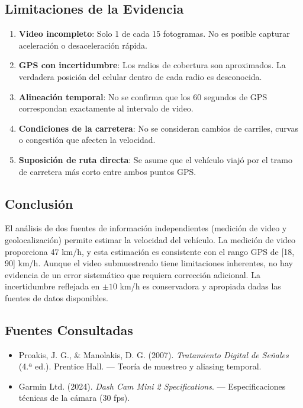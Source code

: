 \documentclass[12pt]{article}
\begin{document}
\subsection*{Limitaciones de la Evidencia}

\begin{enumerate}
    \item \textbf{Video incompleto}: Solo 1 de cada 15 fotogramas. No es posible capturar aceleración o desaceleración rápida.
    
    \item \textbf{GPS con incertidumbre}: Los radios de cobertura son aproximados. La verdadera posición del celular dentro de cada radio es desconocida.
    
    \item \textbf{Alineación temporal}: No se confirma que los 60 segundos de GPS correspondan exactamente al intervalo de video.
    
    \item \textbf{Condiciones de la carretera}: No se consideran cambios de carriles, curvas o congestión que afecten la velocidad.
    
    \item \textbf{Suposición de ruta directa}: Se asume que el vehículo viajó por el tramo de carretera más corto entre ambos puntos GPS.
\end{enumerate}

\subsection*{Conclusión}

El análisis de dos fuentes de información independientes (medición de video y geolocalización) permite estimar la velocidad del vehículo. La medición de video proporciona 47 km/h, y esta estimación es consistente con el rango GPS de [18, 90] km/h. Aunque el video submuestreado tiene limitaciones inherentes, no hay evidencia de un error sistemático que requiera corrección adicional. La incertidumbre reflejada en $\pm 10$ km/h es conservadora y apropiada dadas las fuentes de datos disponibles.

\subsection*{Fuentes Consultadas}

\begin{itemize}
    \item Proakis, J. G., \& Manolakis, D. G. (2007). \textit{Tratamiento Digital de Señales} (4.ª ed.). Prentice Hall. --- Teoría de muestreo y aliasing temporal.
    
    \item Garmin Ltd. (2024). \textit{Dash Cam Mini 2 Specifications}. --- Especificaciones técnicas de la cámara (30 fps).
    
\end{itemize}
\end{document}
